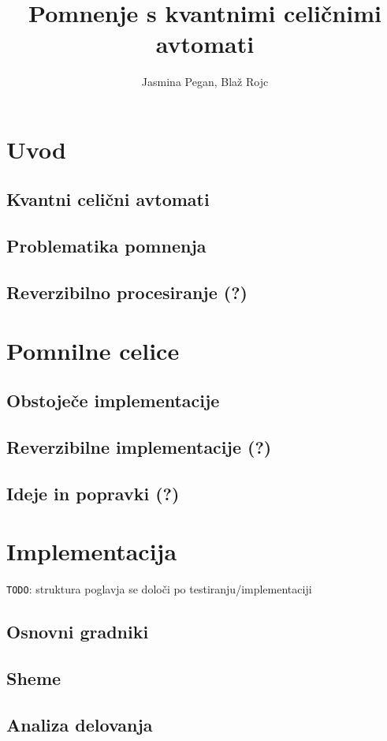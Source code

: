 \documentclass[a4paper, 12pt]{article}
\title{Pomnenje s kvantnimi celičnimi avtomati}
\author{Jasmina Pegan, Blaž Rojc}
\begin{document}
\maketitle



\section{Uvod}

\subsection{Kvantni celični avtomati}

\subsection{Problematika pomnenja}

\subsection{Reverzibilno procesiranje (?)}



\section{Pomnilne celice}

\subsection{Obstoječe implementacije}

\subsection{Reverzibilne implementacije (?)}

\subsection{Ideje in popravki (?)}



\section{Implementacija}

\texttt{TODO}: struktura poglavja se določi po testiranju/implementaciji

\subsection{Osnovni gradniki}

\subsection{Sheme}

\subsection{Analiza delovanja}
\end{document}
